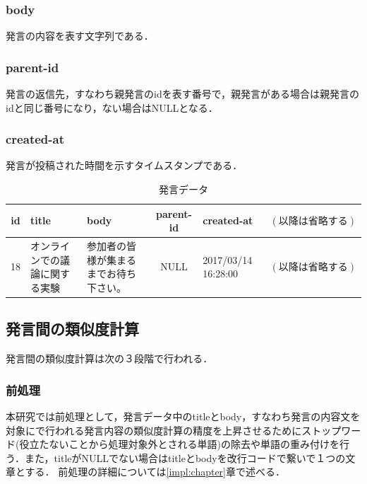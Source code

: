 \subsubsection*{ body}
発言の内容を表す文字列である．
\subsubsection*{ parent-id}
発言の返信先，すなわち親発言のidを表す番号で，親発言がある場合は親発言のidと同じ番号になり，ない場合はNULLとなる．
\subsubsection*{ created-at}
発言が投稿された時間を示すタイムスタンプである．

\begin{table}[htbp]
  \begin{tabular}{| c | p{4cm} | p{4cm} | c | p{2cm} | c |} \hline
     id & title & body & parent-id & created-at & $(以降は省略する)$ \\ \hline
     18 & オンラインでの議論に関する実験 &  参加者の皆様が集まるまでお待ち下さい。 & NULL & 2017/03/14 16:28:00 & $(以降は省略する)$ \\
     \hline
  \end{tabular}
  \caption{発言データ} \label{table:remarkData}
\end{table}

\subsection{発言間の類似度計算}
\label{model:simRemarkl}
発言間の類似度計算は次の３段階で行われる．
\subsubsection*{ 前処理}
本研究では前処理として，発言データ中のtitleとbody，すなわち発言の内容文を対象にで行われる発言内容の類似度計算の精度を上昇させるためにストップワード(役立たないことから処理対象外とされる単語)の除去や単語の重み付けを行う．また，titleがNULLでない場合はtitleとbodyを改行コードで繋いで１つの文章とする．
前処理の詳細については\ref{impl:chapter}章で述べる．
